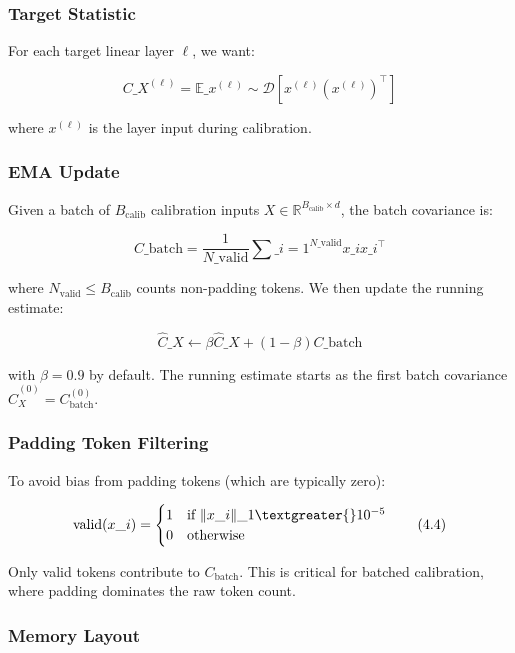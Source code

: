 \subsubsection{Target Statistic}

For each target linear layer $\ell$, we want:

\[
C\_X^{(\ell)} = \mathbb{E}\_{x^{(\ell)} \sim \mathcal{D}}\!\left[x^{(\ell)} (x^{(\ell)})^\top\right]
\tag{4.1}
\]

where $x^{(\ell)}$ is the layer input during calibration.

\subsubsection{EMA Update}

Given a batch of $B_\text{calib}$ calibration inputs $X \in \mathbb{R}^{B_\text{calib} \times d}$, 
the batch covariance is:

\[
C\_\text{batch} = \frac{1}{N\_\text{valid}} \sum\_{i=1}^{N\_\text{valid}} x\_i x\_i^\top
\tag{4.2}
\]

where $N_\text{valid} \leq B_\text{calib}$ counts non-padding tokens. We 
then update the running estimate:

\[
\hat{C}\_X \leftarrow \beta \hat{C}\_X + (1 - \beta) C\_\text{batch}
\tag{4.3}
\]

with $\beta = 0.9$ by default. The running estimate starts as the first 
batch covariance $\hat{C}_X^{(0)} = C_\text{batch}^{(0)}$.

\subsubsection{Padding Token Filtering}

To avoid bias from padding tokens (which are typically zero):

\[
\text{valid}(x\_i) = \begin{cases} 1 & \text{if } \|x\_i\|\_1 \textgreater{} 10^{-5} \\ 0 & \text{otherwise} \end{cases}
\tag{4.4}
\]

Only valid tokens contribute to $C_\text{batch}$. This is critical for 
batched calibration, where padding dominates the raw token count.

\subsubsection{Memory Layout}

